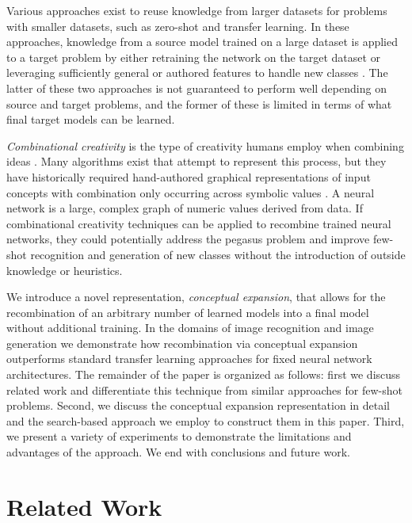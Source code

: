 \documentclass[letterpaper]{article}
\begin{document}
Various approaches exist to reuse knowledge from larger datasets for problems with smaller datasets, such as zero-shot and transfer learning. 
In these approaches, knowledge from a source model trained on a large dataset is applied to a target problem by either retraining the network on the target dataset \cite{levy2012teaching} or leveraging sufficiently general or authored features to handle new classes \cite{xian2017zero}. 
The latter of these two approaches is not guaranteed to perform well depending on source and target problems, and the former of these is limited in terms of what final target models can be learned.

{\em Combinational creativity} 
is
the type of creativity humans employ when combining ideas \cite{boden2004creative}. Many algorithms exist that attempt to represent this process, but they have historically required hand-authored graphical representations of input concepts with combination only occurring across symbolic values \cite{fauconnier2001conceptual}. 
A neural network is a large, complex graph of numeric values derived from data.
If combinational creativity techniques can be applied to recombine trained neural networks, they could potentially address the pegasus problem and improve few-shot recognition and generation of new classes without the introduction of outside knowledge or heuristics.

We introduce a novel representation, \textit{conceptual expansion}, that allows for the recombination of an arbitrary number of learned models into a final model without additional training.
In the domains of image recognition and image generation we demonstrate how recombination via conceptual expansion outperforms standard transfer learning approaches for fixed neural network architectures. 
The remainder of the paper is organized as follows: first we discuss related work and differentiate this technique from similar approaches for few-shot problems. Second, we discuss the conceptual expansion representation in detail and the search-based approach we employ to construct them in this paper. Third, we present a variety of experiments to demonstrate the limitations and advantages of the approach. We end with conclusions and future work.

\section{Related Work}
\end{document}
